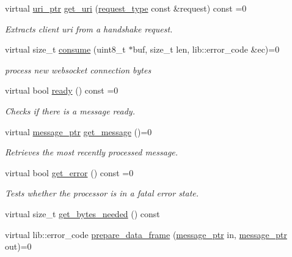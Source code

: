 \begin{DoxyCompactItemize}
virtual \hyperlink{namespacewebsocketpp_aae370ea5ac83a8ece7712cb39fc23f5b}{uri\+\_\+ptr} \hyperlink{classwebsocketpp_1_1processor_1_1processor_acf6b1685e707b06f213b6321a3645095}{get\+\_\+uri} (\hyperlink{classwebsocketpp_1_1processor_1_1processor_ac3926102ce2422e6b40ccea41e764233}{request\+\_\+type} const \&request) const  =0
\begin{DoxyCompactList}\small\item\em Extracts client uri from a handshake request. \end{DoxyCompactList}\item 
virtual size\+\_\+t \hyperlink{classwebsocketpp_1_1processor_1_1processor_a14cb7ee9cd5fa60353ba198f1d3d06c5}{consume} (uint8\+\_\+t $\ast$buf, size\+\_\+t len, lib\+::error\+\_\+code \&ec)=0
\begin{DoxyCompactList}\small\item\em process new websocket connection bytes \end{DoxyCompactList}\item 
virtual bool \hyperlink{classwebsocketpp_1_1processor_1_1processor_ab8dbbb4975f2a0f52efc6281954052b6}{ready} () const  =0
\begin{DoxyCompactList}\small\item\em Checks if there is a message ready. \end{DoxyCompactList}\item 
virtual \hyperlink{classwebsocketpp_1_1processor_1_1processor_a7f189eb2eb87b7293d46026fa0950635}{message\+\_\+ptr} \hyperlink{classwebsocketpp_1_1processor_1_1processor_afb9477aa9e49a7dca59d684277b66932}{get\+\_\+message} ()=0
\begin{DoxyCompactList}\small\item\em Retrieves the most recently processed message. \end{DoxyCompactList}\item 
virtual bool \hyperlink{classwebsocketpp_1_1processor_1_1processor_aae7dfad8679fd11823954b38b9d1dc3f}{get\+\_\+error} () const  =0
\begin{DoxyCompactList}\small\item\em Tests whether the processor is in a fatal error state. \end{DoxyCompactList}\item 
virtual size\+\_\+t \hyperlink{classwebsocketpp_1_1processor_1_1processor_a0df7c5303b7459c86a1a6ecfe70934b1}{get\+\_\+bytes\+\_\+needed} () const 
\item 
virtual lib\+::error\+\_\+code \hyperlink{classwebsocketpp_1_1processor_1_1processor_a1345763249867d742390aa8e2076cb70}{prepare\+\_\+data\+\_\+frame} (\hyperlink{classwebsocketpp_1_1processor_1_1processor_a7f189eb2eb87b7293d46026fa0950635}{message\+\_\+ptr} in, \hyperlink{classwebsocketpp_1_1processor_1_1processor_a7f189eb2eb87b7293d46026fa0950635}{message\+\_\+ptr} out)=0

\end{DoxyCompactItemize}
